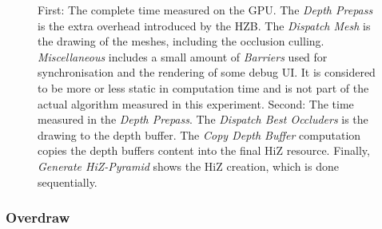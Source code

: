 \begin{figure}[!htb]
  \caption{First: The complete time measured on the \ac{GPU}. The \emph{Depth Prepass} is the extra overhead 
  introduced by the \ac{HZB}. The \emph{Dispatch Mesh} is the drawing of the meshes, including the occlusion 
  culling. \emph{Miscellaneous} includes a small amount of \emph{Barriers} used for synchronisation and the 
  rendering of some debug \ac{UI}. It is considered to be more or less static in computation time and is not 
  part of the actual algorithm measured in this experiment. Second: The time measured in the \emph{Depth Prepass}. 
  The \emph{Dispatch Best Occluders} is the drawing to the depth buffer. The \emph{Copy Depth Buffer} computation 
  copies the depth buffers content into the final \ac{HiZ} resource. Finally, \emph{Generate HiZ-Pyramid} shows 
  the \ac{HiZ} creation, which is done sequentially.}
  \label{fig:terrain-gpu-times}
\end{figure}

\subsubsection*{Overdraw}

